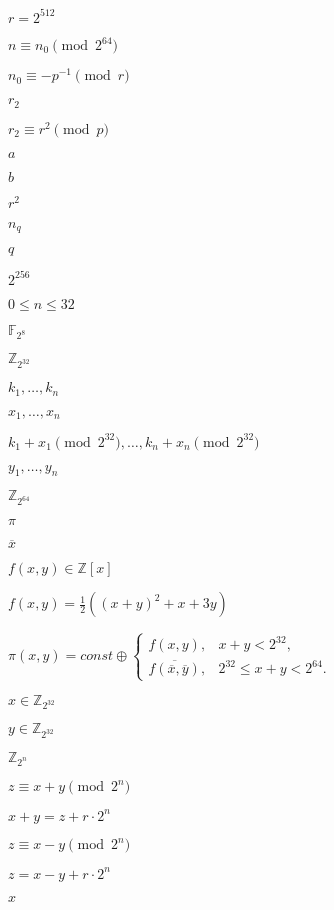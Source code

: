 \documentclass{article}
\begin{document}
$ r=2^{512}$
\pagebreak

$ n \equiv n_0 \pmod{2^{64}}$
\pagebreak

$ n_0 \equiv -p^{-1} \pmod{r}$
\pagebreak

$ r_2 $
\pagebreak

$ r_2 \equiv r^2 \pmod{p}$
\pagebreak

$ a $
\pagebreak

$ b $
\pagebreak

$ r^2$
\pagebreak

$ n_q $
\pagebreak

$ q$
\pagebreak

$ 2^{256} $
\pagebreak

$ 0 \leq n \leq 32 $
\pagebreak

$\mathbb F_{2^8}$
\pagebreak

$ \mathbb Z_{2^{32}}$
\pagebreak

$ k_1, \ldots, k_n$
\pagebreak

$ x_1, \ldots, x_n$
\pagebreak

$ k_1 + x_1 \pmod{2^{32}}, \ldots, k_n + x_n \pmod{2^{32}}$
\pagebreak

$ y_1, \ldots, y_n$
\pagebreak

$ \mathbb Z_{2^{64}} $
\pagebreak

$ \pi $
\pagebreak

$ \overline x $
\pagebreak

$ f(x,y)\in\mathbb Z[x]$
\pagebreak

$ f(x,y) = \frac{1}{2}\left( (x+y)^2 + x + 3y \right)$
\pagebreak

$ \pi(x,y) = const \oplus \left\{ \begin{array}{ll} f(x,y), & x+y < 2^{32}, \\ \overline{f(\overline{x},\overline{y})}, & 2^{32} \le x+y < 2^{64}. \end{array} \right.$
\pagebreak

$ x \in \mathbb Z_{2^{32}} $
\pagebreak

$ y \in \mathbb Z_{2^{32}} $
\pagebreak

$ \mathbb Z_{2^n} $
\pagebreak

$ z \equiv x + y \pmod{2^n}$
\pagebreak

$ x + y = z + r\cdot 2^n$
\pagebreak

$ z \equiv x - y \pmod{2^n}$
\pagebreak

$ z = x - y + r\cdot 2^n$
\pagebreak

$ x $
\pagebreak
\end{document}

